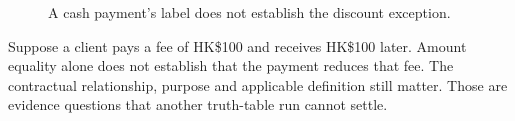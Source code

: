 \begin{figure}[H]
\centering
{}
\caption{A cash payment's label does not establish the discount exception.}\label{fig:teach-M02-06}
\end{figure}

Suppose a client pays a fee of HK\$100 and receives HK\$100 later. Amount equality alone does not establish that the payment reduces that fee. The contractual relationship, purpose and applicable definition still matter. Those are evidence questions that another truth-table run cannot settle.

